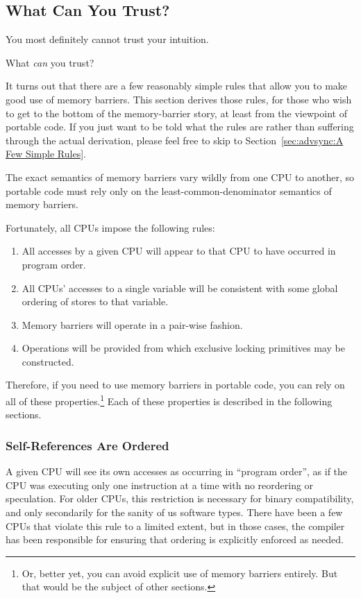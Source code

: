 \subsection{What Can You Trust?}
\label{sec:advsync:What Can You Trust?}

You most definitely cannot trust your intuition.

What \emph{can} you trust?

It turns out that there are a few reasonably simple rules that
allow you to make good use of memory barriers.
This section derives those rules, for those who wish to get
to the bottom of the memory-barrier story, at least from the viewpoint
of portable code.
If you just want to be told what the rules are rather than suffering
through the actual derivation,
please feel free to skip to Section~\ref{sec:advsync:A Few Simple Rules}.

The exact semantics of memory barriers vary wildly from one CPU to
another, so portable code must rely only on the least-common-denominator
semantics of memory barriers.

Fortunately, all CPUs impose the following rules:
\begin{enumerate}
\item	All accesses by a given CPU will appear to that CPU to have
	occurred in program order.
\item	All CPUs' accesses to a single variable will be consistent with
	some global ordering of stores to that variable.
\item	Memory barriers will operate in a pair-wise fashion.
\item	Operations will be provided from which exclusive locking
	primitives may be constructed.
\end{enumerate}

Therefore, if you need to use memory barriers in portable code,
you can rely on all of these properties.\footnote{
	Or, better yet, you can avoid explicit use of memory barriers
	entirely.
	But that would be the subject of other sections.}
Each of these properties is described in the following sections.

\subsubsection{Self-References Are Ordered}

A given CPU will see its own accesses as occurring in ``program order'',
as if the CPU was executing only one instruction at a time with no
reordering or speculation.
For older CPUs, this restriction is necessary for binary compatibility,
and only secondarily for the sanity of us software types.
There have been a few CPUs that violate this rule to a limited extent,
but in those cases, the compiler has been responsible
for ensuring that ordering is explicitly enforced as needed.

